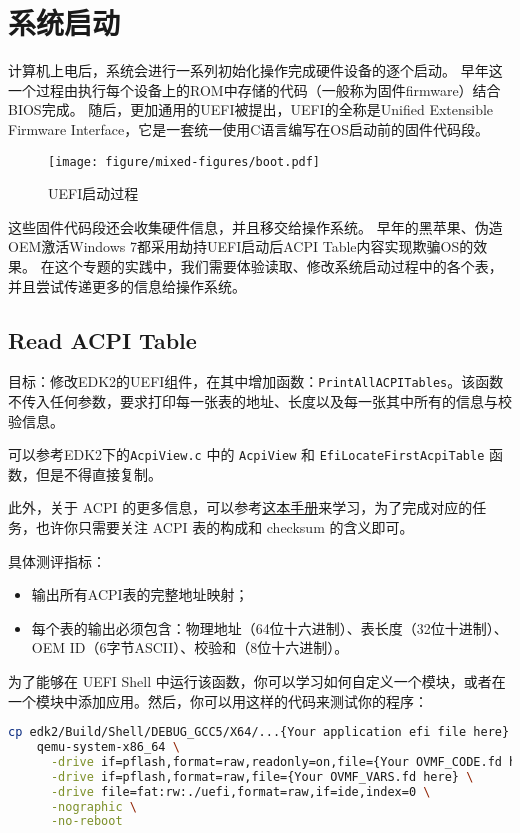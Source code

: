 \chapter{系统启动}
计算机上电后，系统会进行一系列初始化操作完成硬件设备的逐个启动。
早年这一个过程由执行每个设备上的ROM中存储的代码（一般称为固件firmware）结合BIOS完成。
随后，更加通用的UEFI被提出，UEFI的全称是Unified Extensible Firmware Interface，它是一套统一使用C语言编写在OS启动前的固件代码段。

\begin{figure}[h]
    \centering
    \texttt{[image: figure/mixed-figures/boot.pdf]}
    \caption{UEFI启动过程}
    \label{fig:enter-label}
\end{figure}

这些固件代码段还会收集硬件信息，并且移交给操作系统。
早年的黑苹果、伪造OEM激活Windows 7都采用劫持UEFI启动后ACPI Table内容实现欺骗OS的效果。
在这个专题的实践中，我们需要体验读取、修改系统启动过程中的各个表，并且尝试传递更多的信息给操作系统。

\section{Read ACPI Table}
目标：修改EDK2的UEFI组件，在其中增加函数：\texttt{PrintAllACPITables}。该函数不传入任何参数，要求打印每一张表的地址、长度以及每一张其中所有的信息与校验信息。

可以参考EDK2下的\texttt{AcpiView.c} 中的 \texttt{AcpiView} 和 \texttt{EfiLocateFirstAcpiTable} 函数，但是不得直接复制。

此外，关于 ACPI 的更多信息，可以参考\href{https://uefi.org/sites/default/files/resources/ACPI_Spec_6.5a_Final.pdf}{这本手册}来学习，为了完成对应的任务，也许你只需要关注 ACPI 表的构成和 checksum 的含义即可。

具体测评指标：
\begin{itemize}
\item 输出所有ACPI表的完整地址映射；
\item 每个表的输出必须包含：物理地址（64位十六进制）、表长度（32位十进制）、OEM ID（6字节ASCII）、校验和（8位十六进制）。
\end{itemize}

为了能够在 UEFI Shell 中运行该函数，你可以学习如何自定义一个模块，或者在一个模块中添加应用。然后，你可以用这样的代码来测试你的程序：

\begin{lstlisting}[language=bash]
    cp edk2/Build/Shell/DEBUG_GCC5/X64/...{Your application efi file here} ./uefi/AcpiView.efi
    qemu-system-x86_64 \
      -drive if=pflash,format=raw,readonly=on,file={Your OVMF_CODE.fd here} \
      -drive if=pflash,format=raw,file={Your OVMF_VARS.fd here} \
      -drive file=fat:rw:./uefi,format=raw,if=ide,index=0 \
      -nographic \
      -no-reboot
\end{lstlisting}

